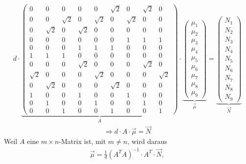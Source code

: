 \begin{align}
	d \cdot
	\underbrace{
	\begin{pmatrix}
		0 & 0 & 0  & 0 & 0 & \sqrt{2} & 0  & \sqrt{2} & 0\\
		 0&0  &\sqrt{2} & 0 & \sqrt{2} & 0 & \sqrt{2} & 0 & 0\\
		 0& \sqrt{2} & 0 & \sqrt{2} & 0 &0 &0  &0  &0 \\
		0&0 &0 &0 &0 &0 & 1 & 1 & 1\\
		0&0 &0 & 1 & 1 & 1 &0 &0 &0 \\
		1 & 1& 1 & 0&0 &0 &0 &0 &0\\
		0&0 &0 & \sqrt{2} & 0 &0 &0& \sqrt{2} &0\\
		\sqrt{2} & 0 & 0& 0 &\sqrt{2} &0 &0 &0 &\sqrt{2}\\
		0 & \sqrt{2} & 0 & 0 & 0 & \sqrt{2} & 0 & 0 &0\\
		1 &0 &0  &1 &0 &0 & 1 & 0 &0 \\
		0 & 1 & 0 & 0 & 1 & 0 & 0 & 1 &0 \\
		0 & 0& 1 & 0 & 0 & 1 & 0 & 0 & 1
	\end{pmatrix}
	}_{A}
	\cdot
	\underbrace{
	\begin{pmatrix}
		\mu_1\\
		\mu_2\\
		\mu_3\\
		\mu_4\\
		\mu_5\\
		\mu_6\\
		\mu_7\\
		\mu_8\\
		\mu_9
	\end{pmatrix}
	}_{\vec{\mu}}
	=
	\underbrace{
	\begin{pmatrix}
		N_1\\
		N_2\\
		N_3\\
		N_4\\
		N_5\\
		N_6\\
		N_7\\
		N_8\\
		N_9		 
	\end{pmatrix}
	}_{\vec{N}}\nonumber
\end{align}
\begin{align}	
	\Rightarrow d \cdot A\cdot\vec{\mu}=\vec{N}
\end{align}
Weil $A$ eine $m\times n $-Matrix ist, mit $m\not= n$, wird daraus
\begin{align}
	\vec{\mu}=\frac{1}{d}\left(A^TA\right)^{-1}\cdot A^T\cdot\vec{N},
\end{align}
